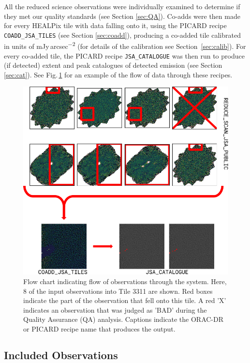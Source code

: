 \documentclass[twocolumn,times]{aastex6}
\newcommand{\jyas}{Jy\,arcsec\textsuperscript{$-$2}}
\begin{document}
All the reduced science observations were individually examined to
determine if they met our quality standards (see Section
\ref{sec:QA}). Co-adds were then made for every HEALPix tile with data
falling onto it, using the PICARD recipe \texttt{COADD\_JSA\_TILES}
(see Section \ref{sec:coadd}), producing a co-added tile calibrated in
units of m\jyas{} (for details of the calibration see
Section~\ref{sec:calib}). For every co-added tile, the PICARD recipe
\texttt{JSA\_CATALOGUE} was then run to produce (if detected) extent
and peak catalogues of detected emission (see Section
\ref{sec:cat}). See Fig.\,\ref{fig:flowchart} for an example of
the flow of data through these recipes.

\begin{figure}
  \centering
  \includegraphics[width=1.0\linewidth]{flowchart}
  \caption{Flow chart indicating flow of observations through the
    system. Here, 8 of the input observations into Tile 3311 are
    shown. Red boxes indicate the part of the observation that fell
    onto this tile. A red 'X' indicates an observation that was judged
    as 'BAD' during the Quality Assurance (QA) analysis. Captions
    indicate the ORAC-DR or PICARD recipe name that produces the output.}
  \label{fig:flowchart}
\end{figure}

\subsection{Included Observations}
\end{document}
